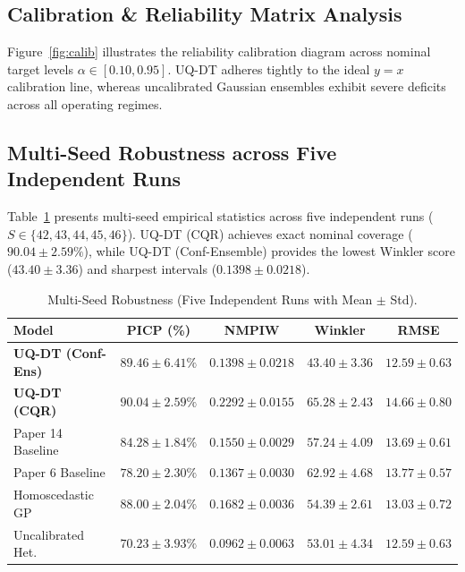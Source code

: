 \documentclass[journal,10pt,twocolumn]{article}
\begin{document}
\subsection{Calibration \& Reliability Matrix Analysis}
Figure~\ref{fig:calib} illustrates the reliability calibration diagram across nominal target levels $\alpha \in [0.10, 0.95]$. UQ-DT adheres tightly to the ideal $y = x$ calibration line, whereas uncalibrated Gaussian ensembles exhibit severe deficits across all operating regimes.

\subsection{Multi-Seed Robustness across Five Independent Runs}
Table~\ref{tab:multiseed} presents multi-seed empirical statistics across five independent runs ($S \in \{42, 43, 44, 45, 46\}$). UQ-DT (CQR) achieves exact nominal coverage ($90.04 \pm 2.59\%$), while UQ-DT (Conf-Ensemble) provides the lowest Winkler score ($43.40 \pm 3.36$) and sharpest intervals ($0.1398 \pm 0.0218$).

\begin{table}[h]
\caption{Multi-Seed Robustness (Five Independent Runs with Mean $\pm$ Std).}
\label{tab:multiseed}
\centering
\small
\begin{tabular}{lcccc}
\toprule
\textbf{Model} & \textbf{PICP (\%)} & \textbf{NMPIW} & \textbf{Winkler} & \textbf{RMSE} \\
\midrule
\textbf{UQ-DT (Conf-Ens)} & $89.46 \pm 6.41\%$ & $\mathbf{0.1398 \pm 0.0218}$ & $\mathbf{43.40 \pm 3.36}$ & $\mathbf{12.59 \pm 0.63}$ \\
\textbf{UQ-DT (CQR)} & $\mathbf{90.04 \pm 2.59\%}$ & $0.2292 \pm 0.0155$ & $65.28 \pm 2.43$ & $14.66 \pm 0.80$ \\
Paper 14 Baseline \cite{wang2026digital} & $84.28 \pm 1.84\%$ & $0.1550 \pm 0.0029$ & $57.24 \pm 4.09$ & $13.69 \pm 0.61$ \\
Paper 6 Baseline \cite{hosseinzadeh2023benchmarking} & $78.20 \pm 2.30\%$ & $0.1367 \pm 0.0030$ & $62.92 \pm 4.68$ & $13.77 \pm 0.57$ \\
Homoscedastic GP & $88.00 \pm 2.04\%$ & $0.1682 \pm 0.0036$ & $54.39 \pm 2.61$ & $13.03 \pm 0.72$ \\
Uncalibrated Het. & $70.23 \pm 3.93\%$ & $0.0962 \pm 0.0063$ & $53.01 \pm 4.34$ & $\mathbf{12.59 \pm 0.63}$ \\
\bottomrule
\end{tabular}
\end{table}
\end{document}
